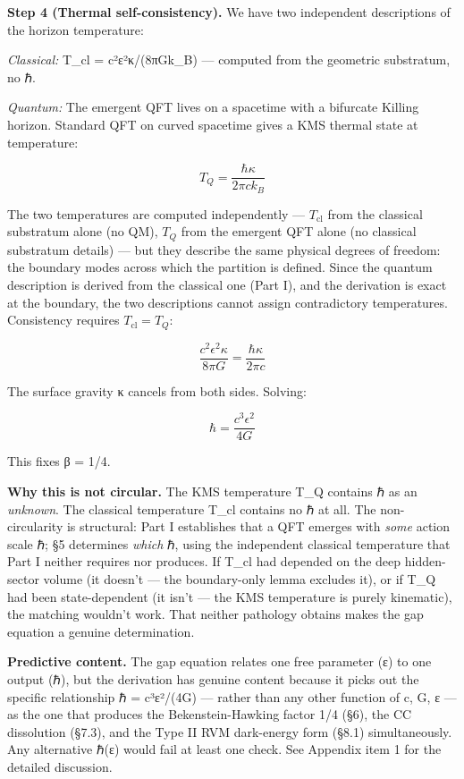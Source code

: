 \documentclass[
]{article}
\begin{document}
\textbf{Step 4 (Thermal self-consistency).} We have two independent
descriptions of the horizon temperature:

\emph{Classical:} T\_cl = c²ε²κ/(8πGk\_B) --- computed from the
geometric substratum, no ℏ.

\emph{Quantum:} The emergent QFT lives on a spacetime with a bifurcate
Killing horizon. Standard QFT on curved spacetime gives a KMS thermal
state at temperature:

\[T_Q = \frac{\hbar \kappa}{2\pi c k_B}\]

The two temperatures are computed independently --- \(T_{\text{cl}}\)
from the classical substratum alone (no QM), \(T_Q\) from the emergent
QFT alone (no classical substratum details) --- but they describe the
same physical degrees of freedom: the boundary modes across which the
partition is defined. Since the quantum description is derived from the
classical one (Part I), and the derivation is exact at the boundary, the
two descriptions cannot assign contradictory temperatures. Consistency
requires \(T_{\text{cl}} = T_Q\):

\[\frac{c^2 \epsilon^2 \kappa}{8\pi G} = \frac{\hbar \kappa}{2\pi c}\]

The surface gravity κ cancels from both sides. Solving:

\[\boxed{\hbar = \frac{c^3 \epsilon^2}{4G}}\]

This fixes β = 1/4.

\textbf{Why this is not circular.} The KMS temperature T\_Q contains ℏ
as an \emph{unknown}. The classical temperature T\_cl contains no ℏ at
all. The non-circularity is structural: Part I establishes that a QFT
emerges with \emph{some} action scale ℏ; §5 determines \emph{which} ℏ,
using the independent classical temperature that Part I neither requires
nor produces. If T\_cl had depended on the deep hidden-sector volume (it
doesn't --- the boundary-only lemma excludes it), or if T\_Q had been
state-dependent (it isn't --- the KMS temperature is purely kinematic),
the matching wouldn't work. That neither pathology obtains makes the gap
equation a genuine determination.

\textbf{Predictive content.} The gap equation relates one free parameter
(ε) to one output (ℏ), but the derivation has genuine content because it
picks out the specific relationship ℏ = c³ε²/(4G) --- rather than any
other function of c, G, ε --- as the one that produces the
Bekenstein-Hawking factor 1/4 (§6), the CC dissolution (§7.3), and the
Type II RVM dark-energy form (§8.1) simultaneously. Any alternative ℏ(ε)
would fail at least one check. See Appendix item 1 for the detailed
discussion.
\end{document}
